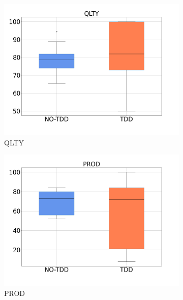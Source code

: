 \begin{figure}[H]
    \centering
    \begin{subfigure}{0.33\textwidth}
        \includegraphics[width=\linewidth]{figures/box_plots/task1_2/QLTY.png}
        \caption{QLTY}
        \label{bp_task1_2_prod}
    \end{subfigure}\hfil
        \begin{subfigure}{0.33\textwidth}
        \includegraphics[width=\linewidth]{figures/box_plots/task1_2/PROD.png}
        \caption{PROD}
        \label{bp_task1_2_prod}
    \end{subfigure}\hfil
    \begin{subfigure}{0.33\textwidth}

\end{subfigure}
\end{figure}
